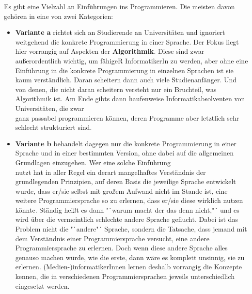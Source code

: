 Es gibt eine Vielzahl an Einführungen ins Programmieren. Die meisten davon gehören in eine von zwei Kategorien:\\

\begin{itemize}
	
	\item \textbf{Variante a} richtet sich an Studierende an Universitäten und ignoriert weitgehend die konkrete Programmierung in einer Sprache. Der Fokus liegt hier vorrangig auf Aspekten der \textbf{Algorithmik}. Diese sind zwar außerordentlich wichtig, um fähigeR InformatikerIn zu werden, aber ohne eine Einführung in die konkrete Programmierung in einzelnen Sprachen ist sie kaum verständlich. Daran scheitern dann auch viele Studienanfänger. Und von denen, die nicht daran scheitern versteht nur ein Bruchteil, was Algorithmik ist. Am Ende gibts dann haufenweise Informatikabsolventen von Universitäten, die zwar\\
	ganz passabel programmieren können, deren Programme aber letztlich sehr schlecht strukturiert sind.\\
	
	\item \textbf{Variante b} behandelt dagegen nur die konkrete Programmierung in einer Sprache und in einer bestimmten Version, ohne dabei auf die allgemeinen Grundlagen einzugehen. Wer eine solche Einführung\\
	nutzt hat in aller Regel ein derart mangelhaftes Verständnis der\\
	grundlegenden Prinzipien, auf deren Basis die jeweilige Sprache entwickelt wurde, dass er/sie selbst mit großem Aufwand nicht im Stande ist, eine weitere Programmiersprache so zu erlernen, dass er/sie diese wirklich nutzen könnte. Ständig heißt es dann "`warum macht der das denn nicht,"´ und es wird über die vermeintlich schlechte andere Sprache geflucht. Dabei ist das Problem nicht die "`andere"´ Sprache, sondern die Tatsache, dass jemand mit dem Verständnis einer Programmiersprache versucht, eine andere Programmiersprache zu erlernen. Doch wenn diese andere Sprache alles genauso machen würde, wie die erste, dann wäre es komplett unsinnig, sie zu erlernen. (Medien-)informatikerInnen lernen deshalb vorrangig die Konzepte kennen, die in verschiedenen Programmiersprachen jeweils unterschiedlich eingesetzt werden.\\

\end{itemize}

